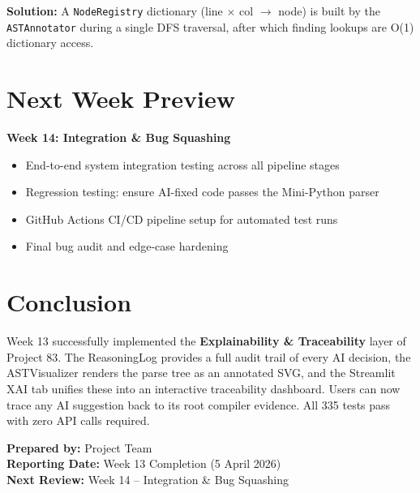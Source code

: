\documentclass[a4paper,11pt]{article}
\begin{document}
\textbf{Solution:} A \texttt{NodeRegistry} dictionary (line $\times$ col $\to$ node) is built by the \texttt{ASTAnnotator} during a single DFS traversal, after which finding lookups are O(1) dictionary access.

\section{Next Week Preview}

\textbf{Week 14: Integration \& Bug Squashing}

\begin{itemize}[leftmargin=*]
    \item End-to-end system integration testing across all pipeline stages
    \item Regression testing: ensure AI-fixed code passes the Mini-Python parser
    \item GitHub Actions CI/CD pipeline setup for automated test runs
    \item Final bug audit and edge-case hardening
\end{itemize}

\section{Conclusion}

Week 13 successfully implemented the \textbf{Explainability \& Traceability} layer of Project 83. The ReasoningLog provides a full audit trail of every AI decision, the ASTVisualizer renders the parse tree as an annotated SVG, and the Streamlit XAI tab unifies these into an interactive traceability dashboard. Users can now trace any AI suggestion back to its root compiler evidence. All 335 tests pass with zero API calls required.

\vspace{5mm}
\noindent\textbf{Prepared by:} Project Team \\
\textbf{Reporting Date:} Week 13 Completion (5 April 2026) \\
\textbf{Next Review:} Week 14 -- Integration \& Bug Squashing
\end{document}
